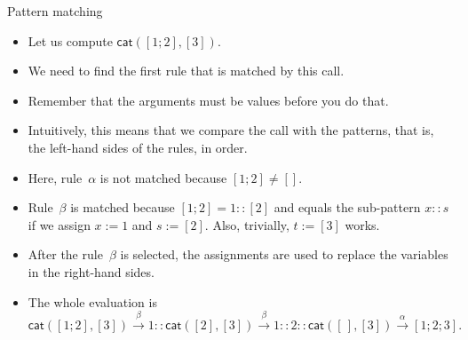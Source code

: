 \documentclass[compress,dvipdfmx]{beamer}
\newcommand\fun[1]{\textsf{#1}}
\newcommand\el{[\,]}
\newcommand\cons[2]{{#1}\!::\!{#2}}
\begin{document}
%
\begin{frame}{Pattern matching}

  \begin{itemize}

    \item Let us compute \(\fun{cat}([1;2],[3])\).

    \item We need to find the first rule that is matched by this call.

    \item Remember that the arguments must be values before you do
      that.

    \item Intuitively, this means that we compare the call with the
      patterns, that is, the left\hyp{}hand sides of the rules, in
      order.

    \item Here, rule~\(\alpha\) is not matched because \([1;2] \neq
      []\).

    \item Rule~\(\beta\) is matched because \([1;2] = 1::[2]\) and
      equals the sub\hyp{}pattern \(x::s\) if we assign \(x := 1\) and
      \(s := [2]\). Also, trivially, \(t := [3]\) works.

    \item After the rule~\(\beta\) is selected, the assignments are
      used to replace the variables in the right\hyp{}hand sides.

    \item The whole evaluation is
    \begin{equation*}
      \fun{cat}([1;2],[3])
      \xrightarrow{\beta}
      \cons{1}{\fun{cat}([2],[3])}
      \xrightarrow{\beta}
      \cons{1}{\cons{2}{\fun{cat}(\el,[3])}}
      \xrightarrow{\alpha}
                    [1;2;3].
    \end{equation*}
  \end{itemize}

\end{frame}
\end{document}
